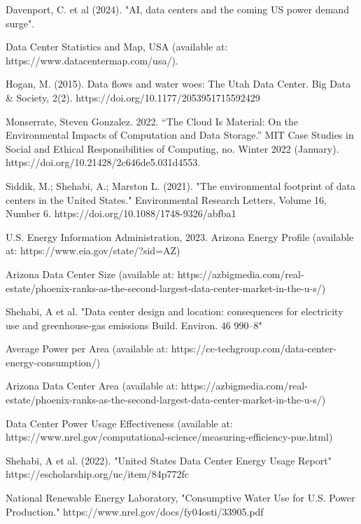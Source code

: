 \documentclass[letterpaper, 12 pt]{article}  %
\begin{document}
     

\begin{thebibliography}{99}

 Davenport, C. et al (2024). "AI, data centers and the coming US power demand surge". 

 Data Center Statistics and Map, USA (available at: https://www.datacentermap.com/usa/).

 Hogan, M. (2015). Data flows and water woes: The Utah Data Center. Big Data \& Society, 2(2). https://doi.org/10.1177/2053951715592429

 Monserrate, Steven Gonzalez. 2022. “The Cloud Is Material: On the Environmental Impacts of Computation and Data Storage.” MIT Case Studies in Social and Ethical Responsibilities of Computing, no. Winter 2022 (January). https://doi.org/10.21428/2c646de5.031d4553.

Siddik, M.; Shehabi, A.; Marston L. (2021). "The environmental footprint of data centers in the United States." Environmental Research Letters, Volume 16, Number 6. https://doi.org/10.1088/1748-9326/abfba1

 U.S. Energy Information Administration, 2023. Arizona Energy Profile (available at: https://www.eia.gov/state/?sid=AZ)

 Arizona Data Center Size (available at: https://azbigmedia.com/real-estate/phoenix-ranks-as-the-second-largest-data-center-market-in-the-u-s/)

 Shehabi, A et al. 
"Data center design and location: consequences for electricity use and greenhouse-gas emissions Build. Environ. 46 990–8"

 Average Power per Area (available at: https://cc-techgroup.com/data-center-energy-consumption/)

 Arizona Data Center Area (available at: https://azbigmedia.com/real-estate/phoenix-ranks-as-the-second-largest-data-center-market-in-the-u-s/)

 Data Center Power Usage Effectiveness (available at: https://www.nrel.gov/computational-science/measuring-efficiency-pue.html)

 Shehabi, A et al. (2022). "United States Data Center Energy Usage Report"  https://escholarship.org/uc/item/84p772fc

 National Renewable Energy Laboratory, "Consumptive Water Use for U.S. Power Production." https://www.nrel.gov/docs/fy04osti/33905.pdf


\end{thebibliography}
\end{document}
